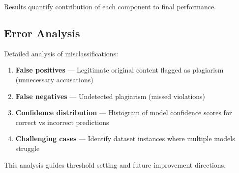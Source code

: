 Results quantify contribution of each component to final performance.

\subsection{Error Analysis}

Detailed analysis of misclassifications:

\begin{enumerate}
  \item \textbf{False positives} --- Legitimate original content flagged as plagiarism (unnecessary accusations)
  
  \item \textbf{False negatives} --- Undetected plagiarism (missed violations)
  
  \item \textbf{Confidence distribution} --- Histogram of model confidence scores for correct vs incorrect predictions
  
  \item \textbf{Challenging cases} --- Identify dataset instances where multiple models struggle
\end{enumerate}

This analysis guides threshold setting and future improvement directions.
